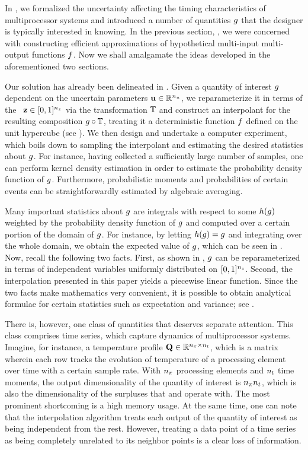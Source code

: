 In , we formalized the uncertainty affecting the timing
characteristics of multiprocessor systems and introduced a number of quantities
$g$ that the designer is typically interested in knowing. In the previous
section, , we were concerned with constructing efficient
approximations of hypothetical multi-input multi-output functions $f$. Now we
shall amalgamate the ideas developed in the aforementioned two sections.

Our solution has already been delineated in . Given a quantity of
interest $g$ dependent on the uncertain parameters $\mathbf{u} \in \mathbb{R}^{n_u}$, we
reparameterize it in terms of the \rvs\ $\mathbf{z} \in [0, 1]^{n_z}$ via the
transformation $\mathbb{T}$ and construct an interpolant for the resulting
composition $g \circ \mathbb{T}$, treating it a deterministic function
$f$ defined on the unit hypercube (see ). We then
design and undertake a computer experiment, which boils down to sampling the
interpolant and estimating the desired statistics about $g$. For instance,
having collected a sufficiently large number of samples, one can perform kernel
density estimation in order to estimate the probability density function of
$g$. Furthermore, probabilistic moments and probabilities of certain events can
be straightforwardly estimated by algebraic averaging.

\begin{remark}
Many important statistics about $g$ are integrals with respect to some $h(g)$
weighted by the probability density function of $g$ and computed over a certain
portion of the domain of $g$. For instance, by letting $h(g) = g$ and
integrating over the whole domain, we obtain the expected value of $g$, which
can be seen in . Now, recall the following two facts. First,
as shown in , $g$ can be reparameterized in terms of
independent variables uniformly distributed on $[0, 1]^{n_z}$. Second, the
interpolation presented in this paper yields a piecewise linear function. Since
the two facts make mathematics very convenient, it is possible to obtain
analytical formulae for certain statistics such as expectation and variance; see
\cite{ma2009}.
\end{remark}

There is, however, one class of quantities that deserves separate attention.
This class comprises time series, which capture dynamics of multiprocessor
systems. Imagine, for instance, a temperature profile $\mathbf{Q} \in \mathbb{R}^{{n_\pi} \times
{n_t}}$, which is a matrix wherein each row tracks the evolution of temperature of
a processing element over time with a certain sample rate. With ${n_\pi}$ processing
elements and ${n_t}$ time moments, the output dimensionality of the quantity of
interest is ${n_\pi}{n_t}$, which is also the dimensionality of the surpluses that
 and  operate with. The most prominent
shortcoming is a high memory usage. At the same time, one can note that the
interpolation algorithm treats each output of the quantity of interest as being
independent from the rest. However, treating a data point of a time series as
being completely unrelated to its neighbor points is a clear loss of
information.

